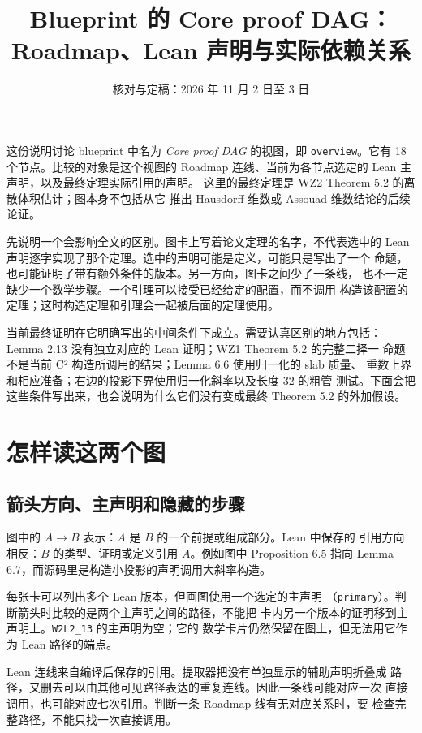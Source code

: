 \documentclass[UTF8,11pt,a4paper,fontset=none]{ctexart}
\title{Blueprint 的 Core proof DAG：\\Roadmap、Lean 声明与实际依赖关系}
\author{}
\date{核对与定稿：2026 年 11 月 2 日至 3 日}
\DeclareRobustCommand{\id}[1]{\nolinkurl{#1}}
\begin{document}
\maketitle

这份说明讨论 blueprint 中名为 \emph{Core proof DAG} 的视图，即
\id{overview}。它有 18 个节点。比较的对象是这个视图的 Roadmap
连线、当前为各节点选定的 Lean 主声明，以及最终定理实际引用的声明。
这里的最终定理是 WZ2 Theorem 5.2 的离散体积估计；图本身不包括从它
推出 Hausdorff 维数或 Assouad 维数结论的后续论证。

先说明一个会影响全文的区别。图卡上写着论文定理的名字，不代表选中的
Lean 声明逐字实现了那个定理。选中的声明可能是定义，可能只是写出了一个
命题，也可能证明了带有额外条件的版本。另一方面，图卡之间少了一条线，
也不一定缺少一个数学步骤。一个引理可以接受已经给定的配置，而不调用
构造该配置的定理；这时构造定理和引理会一起被后面的定理使用。

当前最终证明在它明确写出的中间条件下成立。需要认真区别的地方包括：
Lemma 2.13 没有独立对应的 Lean 证明；WZ1 Theorem 5.2 的完整二择一
命题不是当前 C² 构造所调用的结果；Lemma 6.6 使用归一化的 slab 质量、
重数上界和相应准备；右边的投影下界使用归一化斜率以及长度 32 的粗管
测试。下面会把这些条件写出来，也会说明为什么它们没有变成最终
Theorem 5.2 的外加假设。

\tableofcontents

\section{怎样读这两个图}

\subsection{箭头方向、主声明和隐藏的步骤}

图中的 $A\to B$ 表示：$A$ 是 $B$ 的一个前提或组成部分。Lean 中保存的
引用方向相反：$B$ 的类型、证明或定义引用 $A$。例如图中 Proposition
6.5 指向 Lemma 6.7，而源码里是构造小投影的声明调用大斜率构造。

每张卡可以列出多个 Lean 版本，但画图使用一个选定的主声明
（\id{primary}）。判断箭头时比较的是两个主声明之间的路径，不能把
卡内另一个版本的证明移到主声明上。\id{W2L2_13} 的主声明为空；它的
数学卡片仍然保留在图上，但无法用它作为 Lean 路径的端点。

Lean 连线来自编译后保存的引用。提取器把没有单独显示的辅助声明折叠成
路径，又删去可以由其他可见路径表达的重复连线。因此一条线可能对应一次
直接调用，也可能对应七次引用。判断一条 Roadmap 线有无对应关系时，要
检查完整路径，不能只找一次直接调用。
\end{document}
